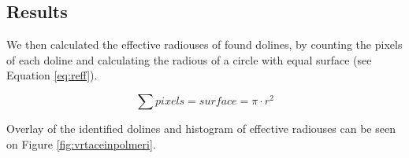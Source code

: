\documentclass[a0,portrait]{a0poster}
\begin{document}
\begin{multicols}{2}

\section*{Results}

We then calculated the effective radiouses of found dolines, by counting the pixels of each doline and calculating the radious of a circle with equal surface (see Equation \ref{eq:reff}).

\begin{equation}
	\sum pixels = surface = \pi \cdot r^2
	\label{eq:reff}
\end{equation}

Overlay of the identified dolines and histogram of effective radiouses can be seen on Figure \ref{fig:vrtaceinpolmeri}.


\end{multicols}
\end{document}
